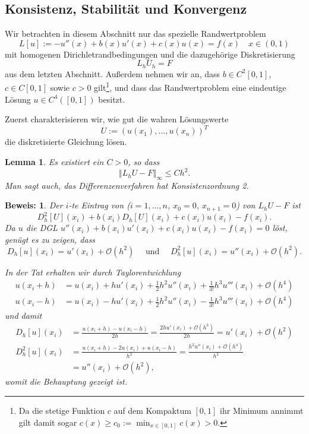 \documentclass[
]{mycourse}
\theoremstyle{mythm}
\newtheorem{lemma}[theorem]{Lemma}
\theoremstyle{break}
\newtheorem*{beweis}{Beweis:}
\newcommand{\norm}[1]{\left\Vert#1\right\Vert}		%
\begin{document}
\subsection{Konsistenz, Stabilität und Konvergenz}

Wir betrachten in diesem Abschnitt nur das spezielle Randwertproblem
\[
L[u]:=-u''(x) + b(x)u'(x) + c(x)u(x)=f(x) \quad x\in (0,1)
\]
mit homogenen Dirichletrandbedingungen und die dazugehörige Diskretisierung
\[
L_h U_h=F
\]
aus dem letzten Abschnitt. Außerdem nehmen wir an, dass $b\in C^2[0,1]$, $c\in C[0,1]$
sowie $c>0$ gilt\footnote{Da die stetige Funktion $c$ auf dem Kompaktum $[0,1]$ ihr Minimum annimmt gilt damit sogar $c(x)\geq c_0:=\min_{x\in [0,1]} c(x)>0$.}, und dass das Randwertproblem
eine eindeutige Lösung $u\in C^4([0,1])$ besitzt. 

Zuerst charakterisieren wir, wie gut die wahren Lösungswerte
\[
U:=(u(x_1),\ldots,u(x_{n}))^T
\]
die diskretisierte Gleichung lösen.

\begin{lemma}\label{lemma:RW_Konsistenz}
Es existiert ein $C>0$, so dass 
\[
\norm{L_h U - F}_\infty \leq C h^2.
\]
Man sagt auch, das Differenzenverfahren hat \emph{Konsistenzordnung} 2.
\end{lemma}
\begin{beweis}
Der $i$-te Eintrag von  ($i=1,\ldots,n$, $x_0=0$, $x_{n+1}=0$) von  $L_h U  - F$ ist 
\[
D_h^2[U](x_i)+b(x_i)D_h[U](x_i)+c(x_i)u(x_i)-f(x_i).
\]
Da $u$ die DGL $u''(x_i)+b(x_i)u'(x_i)+c(x_i)u(x_i)-f(x_i)=0$ löst, genügt es zu zeigen, dass
\[
D_h[u](x_i)=u'(x_i)+\mathcal{O}(h^2)\quad \mbox{ und } \quad D_h^2[u](x_i)=u''(x_i)+\mathcal{O}(h^2).
\]

In der Tat erhalten wir durch Taylorentwichlung
\begin{align*}
u(x_i+h) &=u(x_i)+hu'(x_i)+\frac{1}{2}h^2u''(x_i)+\frac{1}{3!}h^3u'''(x_i)+\mathcal{O}(h^4)\\
u(x_i-h) &=u(x_i)-hu'(x_i)+\frac{1}{2}h^2u''(x_i)-\frac{1}{3!}h^3u'''(x_i)+\mathcal{O}(h^4)
\end{align*}
und damit
\begin{align*}
D_h[u](x_i)&=\frac{u(x_i+h)-u(x_i-h)}{2h}= \frac{2h u'(x_i)+\mathcal{O}(h^3)}{2h}=u'(x_i)+\mathcal{O}(h^2)\\
D^2_h[u](x_i)&= \frac{u(x_i+h)-2u(x_i)+u(x_i-h)}{h^2}=
\frac{h^2u''(x_i) + \mathcal{O}(h^4)}{h^2}\\
&=u''(x_i)+\mathcal{O}(h^2),
\end{align*}
womit die Behauptung gezeigt ist.
\end{beweis}
\end{document}
